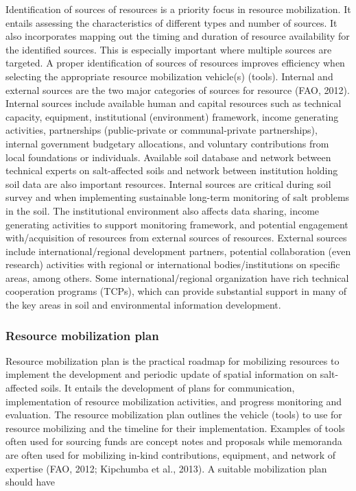 \documentclass[
  10pt,
  b5paper,
]{book}
\begin{document}
Identification of sources of resources is a priority focus in resource mobilization. It entails assessing the characteristics of different types and number of sources. It also incorporates mapping out the timing and duration of resource availability for the identified sources. This is especially important where multiple sources are targeted. A proper identification of sources of resources improves efficiency when selecting the appropriate resource mobilization vehicle(s) (tools).
Internal and external sources are the two major categories of sources for resource (FAO, 2012). Internal sources include available human and capital resources such as technical capacity, equipment, institutional (environment) framework, income generating activities, partnerships (public-private or communal-private partnerships), internal government budgetary allocations, and voluntary contributions from local foundations or individuals. Available soil database and network between technical experts on salt-affected soils and network between institution holding soil data are also important resources. Internal sources are critical during soil survey and when implementing sustainable long-term monitoring of salt problems in the soil. The institutional environment also affects data sharing, income generating activities to support monitoring framework, and potential engagement with/acquisition of resources from external sources of resources. External sources include international/regional development partners, potential collaboration (even research) activities with regional or international bodies/institutions on specific areas, among others. Some international/regional organization have rich technical cooperation programs (TCPs), which can provide substantial support in many of the key areas in soil and environmental information development.

\hypertarget{resource-mobilization-plan}{%
\subsubsection{Resource mobilization plan}\label{resource-mobilization-plan}}

Resource mobilization plan is the practical roadmap for mobilizing resources to implement the development and periodic update of spatial information on salt-affected soils. It entails the development of plans for communication, implementation of resource mobilization activities, and progress monitoring and evaluation. The resource mobilization plan outlines the vehicle (tools) to use for resource mobilizing and the timeline for their implementation. Examples of tools often used for sourcing funds are concept notes and proposals while memoranda are often used for mobilizing in-kind contributions, equipment, and network of expertise (FAO, 2012; Kipchumba et al., 2013). A suitable mobilization plan should have
\end{document}
